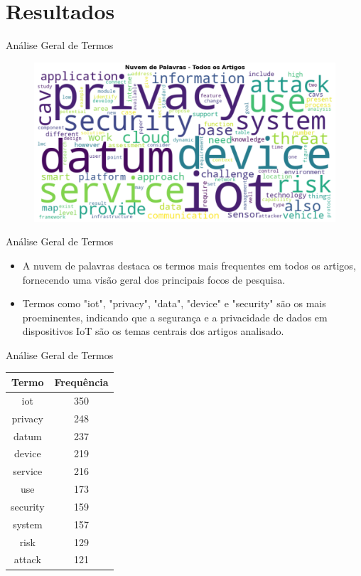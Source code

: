 \documentclass{beamer}
\begin{document}
\section{Resultados}
\begin{frame}{Análise Geral de Termos}
    \begin{figure}
        \centering
        \includegraphics[width=\textwidth]{img/nuvem-palavras.png}
    \end{figure}
\end{frame}

\begin{frame}{Análise Geral de Termos}
    \begin{itemize}
        \item A nuvem de palavras destaca os termos mais frequentes em todos os artigos, fornecendo uma visão geral dos principais focos de pesquisa.
        \item Termos como "iot", "privacy", "data", "device" e "security" são os mais proeminentes, indicando que a segurança e a privacidade de dados em dispositivos IoT são os temas centrais dos artigos analisado.
    \end{itemize}
\end{frame}

\begin{frame}{Análise Geral de Termos}
    \begin{table}
    \centering
    \begin{tabular}{|c|c|}
        \hline
        \textbf{Termo} & \textbf{Frequência} \\
        \hline
        iot & 350 \\
        privacy & 248 \\
        datum & 237 \\
        device & 219 \\
        service & 216 \\
        use & 173 \\
        security & 159 \\
        system & 157 \\
        risk & 129 \\
        attack & 121 \\
        \hline
    \end{tabular}
    \end{table}
\end{frame}
\end{document}
